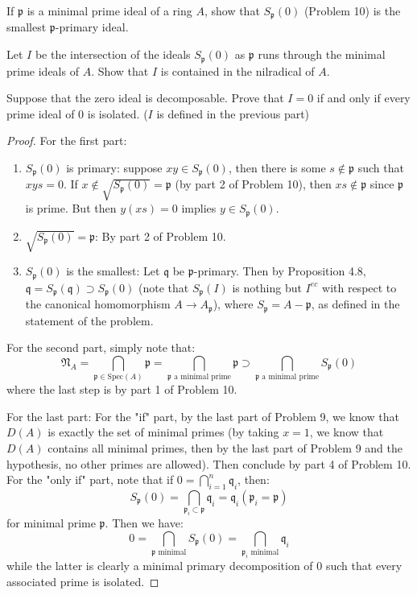 \documentclass{solution}
\begin{document}
\begin{problem}
    If $\mathfrak{p}$ is a minimal prime ideal of a ring $A$, show that $S_{\mathfrak{p}}(0)$ (Problem 10) is the smallest $\mathfrak{p}$-primary ideal.

    Let $I$ be the intersection of the ideals $S_{\mathfrak{p}}(0)$ as $\mathfrak{p}$ runs through the minimal prime ideals of $A$. Show that $I$ is contained in the nilradical of $A$.

    Suppose that the zero ideal is decomposable. Prove that $I = 0$ if and only if every prime ideal of $0$ is isolated. ($I$ is defined in the previous part)
\end{problem}

\begin{proof}
    For the first part:
    \begin{enumerate}
        \item $S_{\mathfrak{p}}(0)$ is primary: suppose $xy \in S_{\mathfrak{p}}(0)$, then there is some $s \notin \mathfrak{p}$ such that $xys = 0$. If $x \notin \sqrt{S_{\mathfrak{p}}(0)} = \mathfrak{p}$ (by part 2 of Problem 10), then $xs \notin \mathfrak{p}$ since $\mathfrak{p}$ is prime. But then $y(xs) = 0$ implies $y \in S_{\mathfrak{p}}(0)$.
        \item $\sqrt{S_{\mathfrak{p}}(0)} = \mathfrak{p}$: By part 2 of Problem 10.
        \item $S_{\mathfrak{p}}(0)$ is the smallest: Let $\mathfrak{q}$ be $\mathfrak{p}$-primary. Then by Proposition 4.8, $\mathfrak{q} = S_{\mathfrak{p}}(\mathfrak{q}) \supset S_{\mathfrak{p}}(0)$ (note that $S_{\mathfrak{p}}(I)$ is nothing but $I^{ec}$ with respect to the canonical homomorphism $A \rightarrow A_{\mathfrak{p}}$), where $S_{\mathfrak{p}} = A - \mathfrak{p}$, as defined in the statement of the problem. 
    \end{enumerate}
    
    For the second part, simply note that:
    $$\mathfrak{N}_A = \bigcap\limits_{\mathfrak{p} \in \mathrm{Spec}(A)} \mathfrak{p} = \bigcap\limits_{\mathfrak{p} \text{ a minimal prime}} \mathfrak{p} \supset \bigcap\limits_{\mathfrak{p} \text{ a minimal prime}} S_{\mathfrak{p}}(0)$$
    where the last step is by part 1 of Problem 10.

    For the last part: For the "if" part, by the last part of Problem 9, we know that $D(A)$ is exactly the set of minimal primes (by taking $x = 1$, we know that $D(A)$ contains all minimal primes, then by the last part of Problem 9 and the hypothesis, no other primes are allowed). Then conclude by part 4 of Problem 10. For the "only if" part, note that if $0 = \bigcap\limits_{i = 1}^{n}\mathfrak{q}_i$, then:
    $$S_{\mathfrak{p}}(0) = \bigcap\limits_{\mathfrak{p}_i \subset \mathfrak{p}} \mathfrak{q}_i = \mathfrak{q}_i (\mathfrak{p}_i = \mathfrak{p})$$
    for minimal prime $\mathfrak{p}$. Then we have:
    $$0 = \bigcap\limits_{\mathfrak{p} \text{ minimal}} S_\mathfrak{p}(0) = \bigcap\limits_{\mathfrak{p}_i \text{ minimal}} \mathfrak{q}_i$$
    while the latter is clearly a minimal primary decomposition of $0$ such that every associated prime is isolated.
\end{proof}
\end{document}
